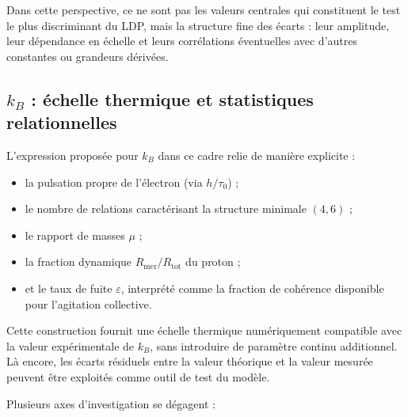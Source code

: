 \documentclass[11pt,a4paper]{article}
\begin{document}
Dans cette perspective, ce ne sont pas les valeurs centrales qui constituent le test le plus discriminant du LDP, mais la structure fine des écarts : leur amplitude, leur dépendance en échelle et leurs corrélations éventuelles avec d’autres constantes ou grandeurs dérivées.

\subsection{\texorpdfstring{\(k_B\)}{kB} : échelle thermique et statistiques relationnelles}

L’expression proposée pour \(k_B\) dans ce cadre relie de manière explicite :
\begin{itemize}
  \item la pulsation propre de l’électron (via \(h/\tau_0\)) ; 
  \item le nombre de relations caractérisant la structure minimale \(\left(4,6\right)\) ; 
  \item le rapport de masses \(\mu\) ; 
  \item la fraction dynamique \(R_{\mathrm{mer}}/R_{\mathrm{tot}}\) du proton ; 
  \item et le taux de fuite \(\varepsilon\), interprété comme la fraction de cohérence disponible pour l’agitation collective. 
\end{itemize}

Cette construction fournit une échelle thermique numériquement compatible avec la valeur expérimentale de \(k_B\), sans introduire de paramètre continu additionnel. Là encore, les écarts résiduels entre la valeur théorique et la valeur mesurée peuvent être exploités comme outil de test du modèle.

Plusieurs axes d’investigation se dégagent :
\end{document}
